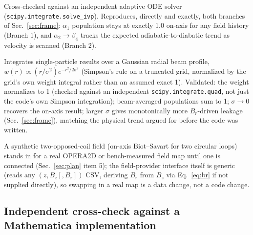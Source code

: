 \documentclass[11pt,a4paper]{article}
\begin{document}
\begin{description}
Cross-checked against an independent adaptive ODE solver
(\texttt{scipy.integrate.solve\_ivp}). Reproduces, directly and exactly,
both branches of Sec.~\ref{sec:frame}: $\alpha_1$ population stays at
exactly 1.0 on-axis for any field history (Branch 1), and
$\alpha_2\to\beta_4$ tracks the expected adiabatic-to-diabatic trend as
velocity is scanned (Branch 2).
\item[\texttt{beam.py}] Integrates single-particle results over a Gaussian
radial beam profile, $w(r)\propto(r/\sigma^2)e^{-r^2/2\sigma^2}$ (Simpson's
rule on a truncated grid, normalized by the grid's own weight integral
rather than an assumed exact 1). Validated: the weight normalizes to 1
(checked against an independent \texttt{scipy.integrate.quad}, not just the
code's own Simpson integration); beam-averaged populations sum to 1;
$\sigma\to0$ recovers the on-axis result; larger $\sigma$ gives
monotonically more $B_r$-driven leakage (Sec.~\ref{sec:frame}), matching
the physical trend argued for before the code was written.
\end{description}

A synthetic two-opposed-coil field (on-axis Biot--Savart for two circular
loops) stands in for a real OPERA2D or bench-measured field map until one is
connected (Sec.~\ref{sec:plan} item 5); the field-provider interface itself
is generic (reads any $(z,B_z[,B_r])$ CSV, deriving $B_r$ from $B_z$ via
Eq.~\eqref{eq:br} if not supplied directly), so swapping in a real map is a
data change, not a code change.


\subsection{Independent cross-check against a Mathematica implementation}
\label{sec:nbcheck}
\end{document}
